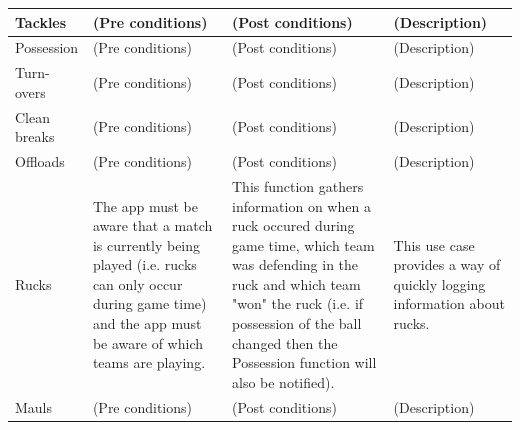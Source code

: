 \documentclass[a4paper,12pt]{report}
\begin{document}
{\begin{itemize}
\begin{center}
\begin{longtable}{| p{3cm} | p{4cm} | p{4cm} | p{4cm} |}
    Tackles & (Pre conditions) & (Post conditions) & (Description)\\ \hline
    Possession & (Pre conditions) & (Post conditions) & (Description)\\ \hline
    Turn-overs & (Pre conditions) & (Post conditions) & (Description)\\ \hline
    Clean breaks & (Pre conditions) & (Post conditions) & (Description)\\ \hline
    Offloads & (Pre conditions) & (Post conditions) & (Description)\\ \hline
    Rucks & The app must be aware that a match is currently being played (i.e. rucks can only occur during game time) and the app must be aware of which teams are playing. & This function gathers information on when a ruck occured during game time, which team was defending in the ruck and which team "won" the ruck (i.e. if possession of the ball changed then the Possession function will also be notified). & This use case provides a way of quickly logging information about rucks.\\ \hline
    Mauls & (Pre conditions) & (Post conditions) & (Description)\\ \hline

    \hline
  \end{longtable}
\end{center}
\newpage

\end{itemize}}
\end{document}
